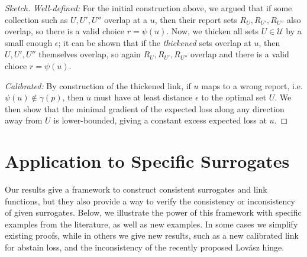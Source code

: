 \documentclass[12pt]{article}
\newcommand{\Comments}{1}
\newcommand{\mytodo}[2]{\ifnum\Comments=1%
  \todo[linecolor=#1!80!black,backgroundcolor=#1,bordercolor=#1!80!black]{#2}\fi}
\newcommand{\btw}[1]{}%
\newcommand{\R}{\mathcal{R}}
\newcommand{\U}{\mathcal{U}}
\begin{document}
\begin{proof}[Sketch]
  \emph{Well-defined:}
  For the initial construction above, we argued that if some collection such as $U,U',U''$ overlap at a $u$, then their report sets $R_U, R_{U'}, R_{U''}$ also overlap, so there is a valid choice $r = \psi(u)$.
  Now, we thicken all sets $U \in \U$ by a small enough $\epsilon$; it can be shown that if the \emph{thickened} sets overlap at $u$, then $U,U',U''$ themselves overlap, so again $R_U, R_{U'}, R_{U''}$ overlap and there is a valid chioce $r = \psi(u)$.

  \emph{Calibrated:} By construction of the thickened link, if $u$ maps to a wrong report, i.e. $\psi(u) \not\in \gamma(p)$, then $u$ must have at least distance $\epsilon$ to the optimal set $U$.
  We then show that the minimal gradient of the expected loss along any direction away from $U$ is lower-bounded, giving a constant excess expected loss at $u$.
\end{proof}

\btw{FUTURE: we should comment in the discussion section that we probably can show that *any* loss embedding $\ell$ must be polyhedral-ish, meaning polyhedral except for stuff that is never optimal.  This theorem would then not need the ``polyhedral'' part. This is related to the ``convex envelope conjucture'', that if $L$ embeds $\ell$ via $\varphi$, you can just take the loss $L'$ such that $L_y$ is the convex envelope of points $\{(\varphi(r),L(r)_y)\}_{r\in\R}$.}
\btw{FUTURE: This prop and theorem give an excellent reason to focus on embeddings, since other techniques do not necessarily give you separated links for free.  Since we know we get them for free, we can just focus on the property, and study elicitation complexity; we know if we have a link at all it can be taken to be separated.  [[Is this true?]]}



\section{Application to Specific Surrogates}\label{sec:examples}

Our results give a framework to construct consistent surrogates and link functions, but they also provide a way to verify the consistency or inconsistency of given surrogates.
Below, we illustrate the power of this framework with specific examples from the literature, as well as new examples.
In some cases we simplify existing proofs, while in others we give new results, such as a new calibrated link for abstain loss, and the inconsistency of the recently proposed Lov\'asz hinge.
\btw{RF: The top-k and hypercube/set examples (except abstain) have the link built in, e.g.\ as the sign function), and they just work around it.  Our results may suggest that it's worth thinking ``outside the box'' (HAH, genious...) and looking for embeddings which are not the hypercube.}
\end{document}
